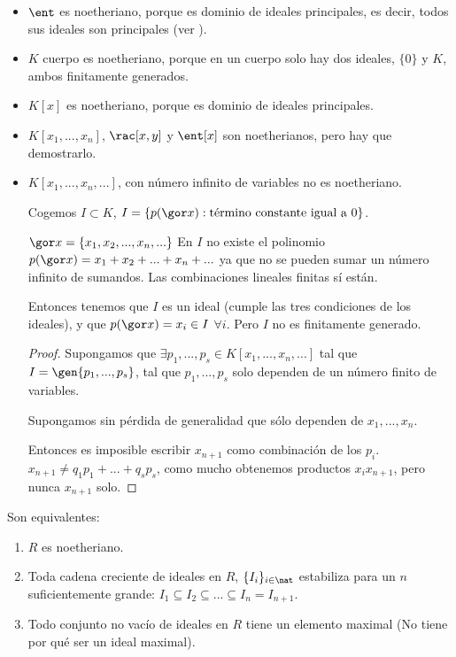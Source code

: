 \begin{example}
	\begin{itemize}
	\item $\ent$ es noetheriano, porque es dominio de ideales principales, es decir, todos sus ideales son principales (ver ).
	\item $K$ cuerpo es noetheriano, porque en un cuerpo solo hay dos ideales, $\{0\}$ y $K$, ambos finitamente generados.
	\item $K[x]$ es noetheriano, porque es dominio de ideales principales.
	\item $K[x_1,...,x_n]$, $\rac[x,y]$ y $\ent[x]$ son noetherianos, pero hay que demostrarlo.
	\item $K[x_1,...,x_n,...]$, con número infinito de variables no es noetheriano.

	Cogemos $I \subset K$, $I= \{ p(\cls{x}): \text{término constante igual a 0} \}$.

	\notacion $\cls{x}=\{x_1,x_2,...,x_n,...\}$
	\nota En $I$ no existe el polinomio $p(\cls{x})=x_1+x_2+...+x_n+...$ ya que no se pueden sumar un número infinito de sumandos. Las combinaciones lineales finitas sí están.

	Entonces tenemos que $I$ es un ideal (cumple las tres condiciones de los ideales), y que $p(\cls{x})=x_i \in I$ $ \forall i$. Pero $I$ no es finitamente generado.
	\begin{proof}
		Supongamos que $\exists p_1,...,p_s \in K[x_1,...,x_n,...]$ tal que $I=\gen{p_1,...,p_s}$, tal que $p_1,...,p_s$ solo dependen de un número finito de variables.

		Supongamos sin pérdida de generalidad que sólo dependen de $x_1,...,x_n$.

		Entonces es imposible escribir $x_{n+1}$ como combinación de los $p_i$. $x_{n+1}\neq q_1p_1+...+q_sp_s$, como mucho obtenemos productos $x_ix_{n+1}$, pero nunca $x_{n+1}$ solo.
	\end{proof}
	\end{itemize}
\end{example}

\begin{prop}\label{prop:caracterizacion_noetheriano}
	Son equivalentes:
	\begin{enumerate}
		\item $R$ es noetheriano.
		\item Toda cadena creciente de ideales en $R$, $\{I_i\}_{i \in \nat}$ estabiliza para un $n$ suficientemente grande: $I_1 \subseteq I_2 \subseteq ... \subseteq I_n = I_{n+1}$.
		\item Todo conjunto no vacío de ideales en $R$ tiene un elemento maximal (No tiene por qué ser un ideal maximal).
	\end{enumerate}
\end{prop}

